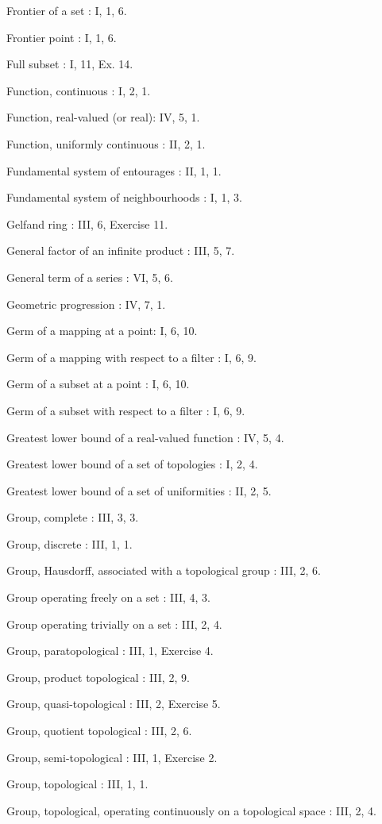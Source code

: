Frontier of a set : I, 1, 6.

Frontier point : I, 1, 6.

Full subset : I, 11, Ex. 14.

Function, continuous : I, 2, 1.

Function, real-valued (or real): IV, 5, 1.

Function, uniformly continuous : II, 2, 1.

Fundamental system of entourages : II, 1, 1.

Fundamental system of neighbourhoods : I, 1, 3.

Gelfand ring : III, 6, Exercise 11.

General factor of an infinite product : III, 5, 7.

General term of a series : VI, 5, 6.

Geometric progression : IV, 7, 1.

Germ of a mapping at a point: I, 6, 10.

Germ of a mapping with respect to a filter : I, 6, 9.

Germ of a subset at a point : I, 6, 10.

Germ of a subset with respect to a filter : I, 6, 9.

Greatest lower bound of a real-valued function : IV, 5, 4.

Greatest lower bound of a set of topologies : I, 2, 4.

Greatest lower bound of a set of uniformities : II, 2, 5.

Group, complete : III, 3, 3.

Group, discrete : III, 1, 1.

Group, Hausdorff, associated with a topological group : III, 2, 6.

Group operating freely on a set : III, 4, 3.

Group operating trivially on a set : III, 2, 4.

Group, paratopological : III, 1, Exercise 4.

Group, product topological : III, 2, 9.

Group, quasi-topological : III, 2, Exercise 5.

Group, quotient topological : III, 2, 6.

Group, semi-topological : III, 1, Exercise 2.

Group, topological : III, 1, 1.

Group, topological, operating continuously on a topological space : III, 2, 4.

